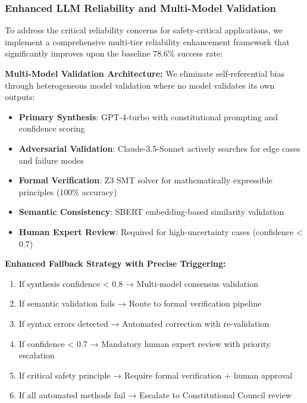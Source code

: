 \documentclass[sigconf,natbib]{acmart}
\begin{document}
\subsubsection{Enhanced LLM Reliability and Multi-Model Validation}
\label{subsubsec:enhanced_llm_reliability}
To address the critical reliability concerns for safety-critical applications, we implement a comprehensive multi-tier reliability enhancement framework that significantly improves upon the baseline 78.6\% success rate:

\textbf{Multi-Model Validation Architecture:} We eliminate self-referential bias through heterogeneous model validation where no model validates its own outputs:
\begin{itemize}
    \item \textbf{Primary Synthesis}: GPT-4-turbo with constitutional prompting and confidence scoring
    \item \textbf{Adversarial Validation}: Claude-3.5-Sonnet actively searches for edge cases and failure modes
    \item \textbf{Formal Verification}: Z3 SMT solver for mathematically expressible principles (100\% accuracy)
    \item \textbf{Semantic Consistency}: SBERT embedding-based similarity validation
    \item \textbf{Human Expert Review}: Required for high-uncertainty cases (confidence < 0.7)
\end{itemize}

\textbf{Enhanced Fallback Strategy with Precise Triggering:}
\begin{enumerate}
    \item If synthesis confidence < 0.8 → Multi-model consensus validation
    \item If semantic validation fails → Route to formal verification pipeline
    \item If syntax errors detected → Automated correction with re-validation
    \item If confidence < 0.7 → Mandatory human expert review with priority escalation
    \item If critical safety principle → Require formal verification + human approval
    \item If all automated methods fail → Escalate to Constitutional Council review
\end{enumerate}
\end{document}
